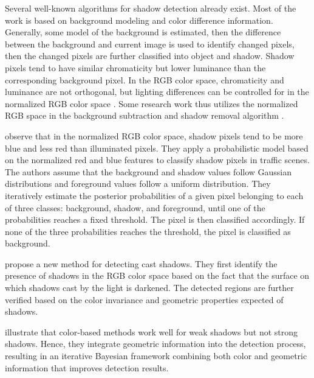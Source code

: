 Several well-known algorithms for shadow detection already exist. Most of the
work is based on background modeling and color difference information.
Generally, some model of the background is estimated, then the difference
between the background and current image is used to identify changed pixels,
then the changed pixels are further classified into object and shadow.  Shadow
pixels tend to have similar chromaticity but lower luminance than the
corresponding background pixel.  In the RGB color space, chromaticity and
luminance are not orthogonal, but lighting differences can be controlled for in
the normalized RGB color space .  Some research
work thus utilizes the normalized RGB space in the background subtraction and
shadow removal algorithm
.

 observe that in the normalized RGB color space,
shadow pixels tend to be more blue and less red than illuminated pixels.  They
apply a probabilistic model based on the normalized red and blue features to
classify shadow pixels in traffic scenes. The authors assume that the
background and shadow values follow Gaussian distributions and foreground
values follow a uniform distribution. They iteratively estimate the posterior
probabilities of a given pixel belonging to each of three classes: background,
shadow, and foreground, until one of the probabilities reaches a fixed
threshold. The pixel is then classified accordingly.  If none of the three
probabilities reaches the threshold, the pixel is classified as background.

 propose a new method for detecting cast shadows.
They first identify the presence of shadows in the RGB color space based on the
fact that the surface on which shadows cast by the light is darkened. The
detected regions are further verified based on the color invariance and
geometric properties expected of shadows.

 illustrate that color-based methods work well
for weak shadows but not strong shadows. Hence, they integrate geometric
information into the detection process, resulting in an iterative Bayesian
framework combining both color and geometric information that improves
detection results.

